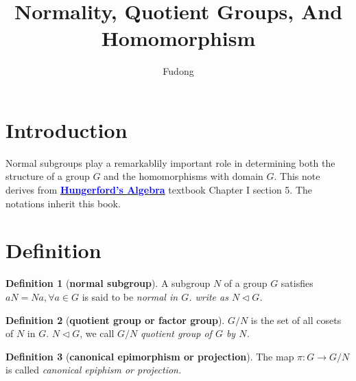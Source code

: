 \documentclass{article}
\title{\textbf{Normality, Quotient Groups, And Homomorphism}}
\author{Fudong}
\theoremstyle{plain}
\theoremstyle{definition}
\newtheorem{defn}{Definition}[section] %
\newcommand{\normal}{\vartriangleleft}%
\begin{document}
\maketitle
\section{Introduction}
Normal subgroups play a remarkablily important role in determining both the structure of a group $G$ and the homomorphisms with domain $G$. This note derives from \href{http://www.amazon.com/Algebra-Graduate-Texts-Mathematics-v/dp/0387905189}{\textcolor{blue}{\textbf{Hungerford's Algebra}}} textbook Chapter I section 5. The notations inherit this book.
\section{Definition}

\begin{defn}[\textbf{normal subgroup}]
A subgroup $N$ of a group $G$ satisfies $aN=Na,\forall a \in G$ is said to be \em{normal} in $G$. write as $N\normal G$.
\end{defn}
\begin{defn}[\textbf{quotient group or factor group}]
$G/N$ is the set of all cosets of $N$ in $G$. $N\normal G$, we call $G/N$ \em{quotient group} of $G$ by $N$. 
\end{defn}
\begin{defn}[\textbf{canonical epimorphism or projection}]
The map $\pi:G\rightarrow G/N$ is called \em{canonical epiphism or projection}.
\end{defn}
\end{document}
